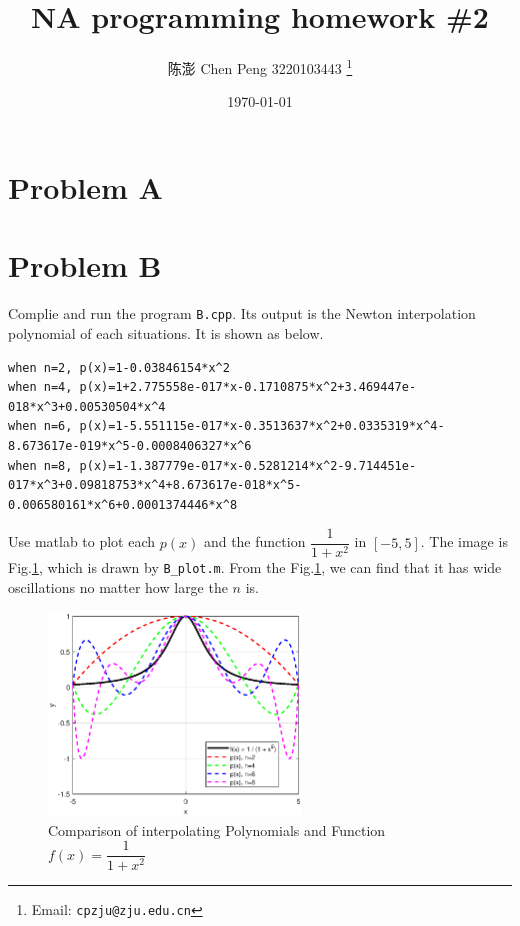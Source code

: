 \documentclass[a4paper]{article}
\begin{document}
\title{NA programming homework \#2}

\author{陈澎 Chen Peng 3220103443
  \thanks{Email: \texttt{cpzju@zju.edu.cn}}}


\date{\today}

\maketitle

\section*{Problem A}


\section*{Problem B}
Complie and run the program \verb|B.cpp|. Its output is the Newton interpolation polynomial of each situations.
It is shown as below.
\begin{lstlisting}[breaklines=true]
when n=2, p(x)=1-0.03846154*x^2
when n=4, p(x)=1+2.775558e-017*x-0.1710875*x^2+3.469447e-018*x^3+0.00530504*x^4
when n=6, p(x)=1-5.551115e-017*x-0.3513637*x^2+0.0335319*x^4-8.673617e-019*x^5-0.0008406327*x^6
when n=8, p(x)=1-1.387779e-017*x-0.5281214*x^2-9.714451e-017*x^3+0.09818753*x^4+8.673617e-018*x^5-0.006580161*x^6+0.0001374446*x^8
\end{lstlisting}

Use matlab to plot each $p(x)$ and the function $\dfrac{1}{1+x^2}$ in $[-5,5]$. The image is Fig.\ref{fig1}, which is drawn by \verb|B_plot.m|.
From the Fig.\ref{fig1}, we can find that it has wide oscillations no matter how large the $n$ is.
\begin{figure}[htbp]
  \centering
  \includegraphics[width=0.6\textwidth]{images/B_pic.eps}
  \renewcommand{\figurename}{Fig.}
  \caption{Comparison of interpolating Polynomials and Function $f(x)=\dfrac{1}{1+x^2}$}
  \label{fig1}
\end{figure}
\end{document}
